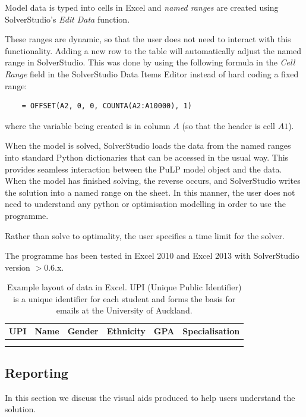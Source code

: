 \documentclass[12pt]{ORSNZ}
\begin{document}
Model data is typed into cells in Excel and \emph{named ranges} are created using SolverStudio's \emph{Edit Data} function. 

These ranges are dynamic, so that the user does not need to interact with this functionality. Adding a new row to the table will automatically adjust the named range in SolverStudio. This was done by using the following formula in the \emph{Cell Range} field in the SolverStudio Data Items Editor instead of hard coding a fixed range:

\begin{verbatim}
	= OFFSET(A2, 0, 0, COUNTA(A2:A10000), 1)
\end{verbatim}

where the variable being created is in column $A$ (so that the header is cell $A1$).

When the model is solved, SolverStudio loads the data from the named ranges into standard Python dictionaries that can be accessed in the usual way. This provides seamless interaction between the PuLP model object and the data. When the model has finished solving, the reverse occurs, and SolverStudio writes the solution into a named range on the sheet. In this manner, the user does not need to understand any python or optimisation modelling in order to use the programme.

Rather than solve to optimality, the user specifies a time limit for the solver.

The programme has been tested in Excel 2010 and Excel 2013 with SolverStudio version $>$0.6.x.

\begin{table}[!ht]
	\centering
	\begin{tabular}{c | c | c | c | c | c}
	UPI & Name & Gender & Ethnicity & GPA & Specialisation\\
	\hline
	& & & & & \\
	& & & & & 
	\end{tabular}
	\caption{Example layout of data in Excel. UPI (Unique Public Identifier) is a unique identifier for each student and forms the basis for emails at the University of Auckland.}
\end{table}

\subsection{Reporting} \label{reporting}
In this section we discuss the visual aids produced to help users understand the solution.
\end{document}

